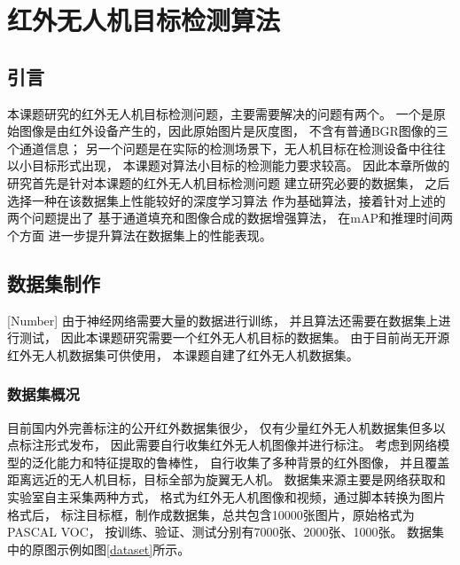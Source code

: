 
\chapter{红外无人机目标检测算法}

\section{引言}
本课题研究的红外无人机目标检测问题，主要需要解决的问题有两个。
一个是原始图像是由红外设备产生的，因此原始图片是灰度图，
不含有普通BGR图像的三个通道信息；
另一个问题是在实际的检测场景下，无人机目标在检测设备中往往以小目标形式出现，
本课题对算法小目标的检测能力要求较高。
因此本章所做的研究首先是针对本课题的红外无人机目标检测问题
建立研究必要的数据集，
之后选择一种在该数据集上性能较好的深度学习算法
作为基础算法，接着针对上述的两个问题提出了
基于通道填充和图像合成的数据增强算法，
在mAP和推理时间两个方面
进一步提升算法在数据集上的性能表现。

\section{数据集制作}[Number]
由于神经网络需要大量的数据进行训练，
并且算法还需要在数据集上进行测试，
因此本课题研究需要一个红外无人机目标的数据集。
由于目前尚无开源红外无人机数据集可供使用，
本课题自建了红外无人机数据集。

\subsection{数据集概况}
目前国内外完善标注的公开红外数据集很少，
仅有少量红外无人机数据集但多以点标注形式发布，
因此需要自行收集红外无人机图像并进行标注。
考虑到网络模型的泛化能力和特征提取的鲁棒性，
自行收集了多种背景的红外图像，
并且覆盖距离远近的无人机目标，目标全部为旋翼无人机。
数据集来源主要是网络获取和实验室自主采集两种方式，
格式为红外无人机图像和视频，通过脚本转换为图片格式后，
标注目标框，制作成数据集，总共包含10000张图片，原始格式为PASCAL VOC，
按训练、验证、测试分别有7000张、2000张、1000张。
数据集中的原图示例如图\ref{dataset}所示。

